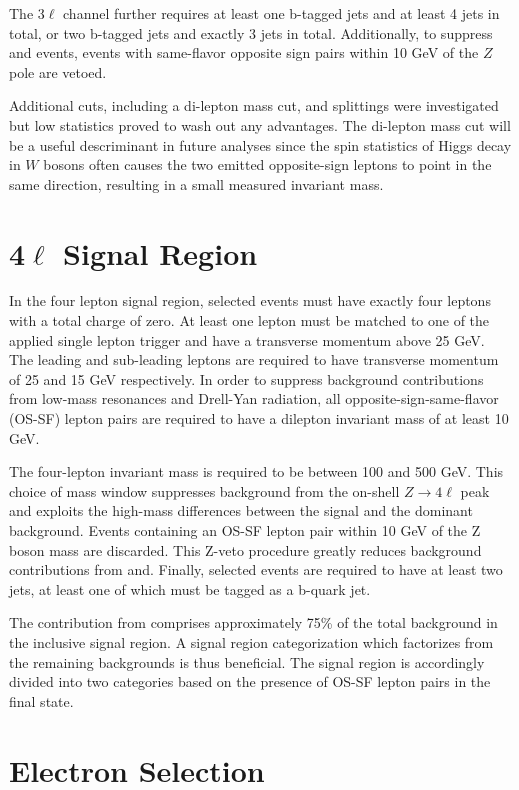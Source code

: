 The 3$\ell$ channel further requires at least one b-tagged jets and at least 4 jets in total, or two b-tagged jets and exactly 3 jets in 
total. Additionally, to suppress \WZ and \zj events, events with same-flavor opposite sign pairs
within 10 GeV of the $Z$ pole are vetoed.

Additional cuts, including a di-lepton mass cut, and splittings were investigated but low statistics proved to wash out any advantages.
The di-lepton mass cut will be a useful descriminant in future analyses since the spin statistics of Higgs decay in $W$ bosons often
causes the two emitted opposite-sign leptons to point in the same direction, resulting in a small measured invariant mass. 

\section{4$\ell$ Signal Region}

In the four lepton signal region, selected events must have exactly four leptons with a total charge of zero. 
At least one lepton must be matched to one of the applied single lepton trigger and have a transverse momentum above 25 GeV. 
The leading and sub-leading leptons are required to have transverse momentum of 25 and 15 GeV respectively. 
In order to suppress background contributions from low-mass resonances and Drell-Yan radiation, all opposite-sign-same-flavor (OS-SF) lepton pairs are required to have a dilepton invariant mass of at least 10 GeV. 

The four-lepton invariant mass is required to be between 100 and 500 GeV. 
This choice of mass window suppresses background from the on-shell $Z\to4\ell$ peak and exploits the high-mass differences between the signal and the dominant \ttZ background. 
Events containing an OS-SF lepton pair within 10 GeV of the Z boson mass are discarded. 
This Z-veto procedure greatly reduces background contributions from \ZZ and\ttZ. 
Finally, selected events are required to have at least two jets, at least one of which must be tagged as a b-quark jet.  

The contribution from \ttZ comprises approximately 75\% of the total background in the inclusive signal region. 
A signal region categorization which factorizes \ttZ from the remaining backgrounds is thus beneficial. 
The signal region is accordingly divided into two categories based on the presence of OS-SF lepton pairs in the final state. 

\section{Electron Selection}

